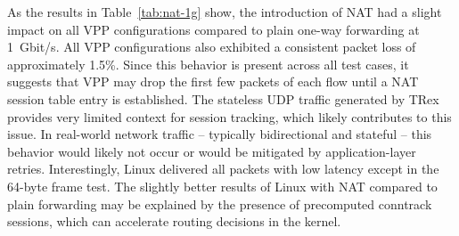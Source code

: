 As the results in Table~\ref{tab:nat-1g} show, the introduction of NAT had a slight impact on all VPP configurations compared to plain one-way forwarding at 1~Gbit/s.  
All VPP configurations also exhibited a consistent packet loss of approximately 1.5\%.
Since this behavior is present across all test cases, it suggests that VPP may drop the first few packets of each flow until a NAT session table entry is established.  
The stateless UDP traffic generated by TRex provides very limited context for session tracking, which likely contributes to this issue.  
In real-world network traffic -- typically bidirectional and stateful -- this behavior would likely not occur or would be mitigated by application-layer retries.
Interestingly, Linux delivered all packets with low latency except in the 64-byte frame test.  
The slightly better results of Linux with NAT compared to plain forwarding may be explained by the presence of precomputed conntrack sessions, which can accelerate routing decisions in the kernel.

